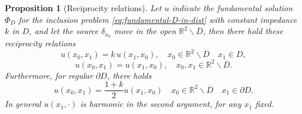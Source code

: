 \documentclass[10pt, a4paper, twoside, openright]{book}
\theoremstyle{definition}
\theoremstyle{plain}
\theoremstyle{plain}
\theoremstyle{plain}
\newtheorem{proposition}[subsection]{Proposition}
\theoremstyle{plain}
\theoremstyle{plain}
\theoremstyle{plain}
\theoremstyle{plain}
\theoremstyle{plain}
\begin{document}
% 
\begin{center}
\end{center}
\begin{proposition}[Reciprocity relations]
 \label{prop:reciprocity}
 Let $u$ indicate the fundamental solution $\Phi_D$ for the inclusion problem \eqref{eq:fundamental-D-in-dist} with constant impedance $k$ in $D$, and let the source $\delta_{x_0}$ move in the open $\mathbb{R}^2\backslash\overline{D}$, then there hold these reciprocity relations
 \begin{equation}
  u(x_0,x_1) = k\, u(x_1,x_0),\quad x_0\in \mathbb{R}^2\backslash\overline{D} \quad x_1\in D,
 \end{equation} 
 \begin{equation}
  u(x_0,x_1) = u(x_1,x_0),\quad x_0, x_1\in \mathbb{R}^2\backslash \overline{D}.
 \end{equation}
 Furthermore, for regular $\partial D$, there holds
 \begin{equation}
 \label{eq:reciprocity-boundary}
  u(x_0,x_1) = \frac{1+k}{2}u(x_1,x_0)\quad x_0\in \mathbb{R}^2\backslash \overline{D} \quad x_1\in \partial D.
 \end{equation}
 In general $u(x_1,\cdot)$ is harmonic in the second argument, for any $x_1$ fixed.
 \end{proposition}
\end{document}
